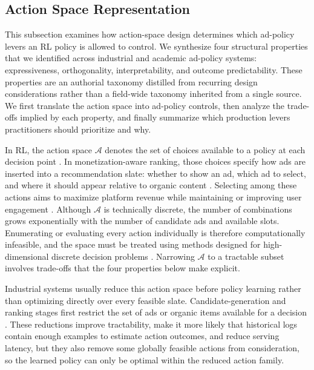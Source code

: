 \documentclass[manuscript,review,screen]{acmart}
\begin{document}
\subsection{Action Space Representation}
\label{action_space_representation}

This subsection examines how action-space design determines which ad-policy levers an RL policy is allowed to control. We synthesize four structural properties that we identified across industrial and academic ad-policy systems: expressiveness, orthogonality, interpretability, and outcome predictability. These properties are an authorial taxonomy distilled from recurring design considerations rather than a field-wide taxonomy inherited from a single source. We first translate the action space into ad-policy controls, then analyze the trade-offs implied by each property, and finally summarize which production levers practitioners should prioritize and why.

In RL, the action space $\mathcal{A}$ denotes the set of choices available to a policy at each decision point \cite{Sutton1998}. In monetization-aware ranking, those choices specify how ads are inserted into a recommendation slate: whether to show an ad, which ad to select, and where it should appear relative to organic content \cite{ie2019slateq, yan2020ads}. Selecting among these actions aims to maximize platform revenue while maintaining or improving user engagement \cite{zhao2020jointly}. Although $\mathcal{A}$ is technically discrete, the number of combinations grows exponentially with the number of candidate ads and available slots. Enumerating or evaluating every action individually is therefore computationally infeasible, and the space must be treated using methods designed for high-dimensional discrete decision problems \cite{ie2019recsim, dulac2021challenges}. Narrowing $\mathcal{A}$ to a tractable subset involves trade-offs that the four properties below make explicit.

Industrial systems usually reduce this action space before policy learning rather than optimizing directly over every feasible slate. Candidate-generation and ranking stages first restrict the set of ads or organic items available for a decision \cite{covington2016deep, cheng2016wide, zhao2024survey}. These reductions improve tractability, make it more likely that historical logs contain enough examples to estimate action outcomes, and reduce serving latency, but they also remove some globally feasible actions from consideration, so the learned policy can only be optimal within the reduced action family.
\end{document}
